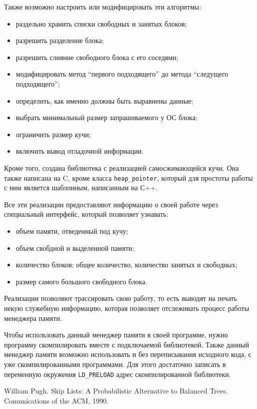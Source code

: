 Также возможно настроить или модифицировать эти алгоритмы:

\begin{itemize}
\item раздельно хранить списки свободных и занятых блоков;
\item разрешить разделение блока;
\item разрешить слияние свободного блока с его соседями;
\item модифицировать метод ``первого подходящего'' до метода ``следущего подходящего'';
\item определить, как именно должны быть выравнены данные;
\item выбрать минимальный размер запрашиваемого у ОС блока;
\item ограничить размер кучи;
\item включить вывод отладочной информации.
\end{itemize}

Кроме того, создана библиотека с реализацией самосжимающейся кучи. Она также написана на C,
кроме класса \lstinline{heap_pointer}, который для простоты работы с ним является шаблонным,
написанным на С++. 

Все эти реализации предоставляют информацию о своей работе через специальный интерфейс,
который позволяет узнавать:

\begin{itemize}
\item объем памяти, отведенный под кучу;
\item объем свобдной и выделенной памяти;
\item количество блоков: общее количество, количество занятых и свободных;
\item размер самого большого свободного блока.
\end{itemize}

Реализации позволяют трассировать свою работу, то есть выводят на печать некую 
служебную информацию, которая позволяет отслеживать процесс работы менеджера памяти.

Чтобы использовать данный менеджер памяти в своей программе, нужно программу скомпилировать вместе
с подключаемой библиотекой. Также данный менеджер памяти возможно использовать и без переписывания исходного кода,
с уже скомпилированными программами.  Для этого достаточно записать в переменную
окружения \lstinline{LD_PRELOAD} адрес скомпилированной библиотеки.

\begin{thebibliography}{99}
William Pugh. Skip Lists: A Probabilistic Alternative to Balanced Trees. Comunications of the ACM, 1990.
\end{thebibliography}
